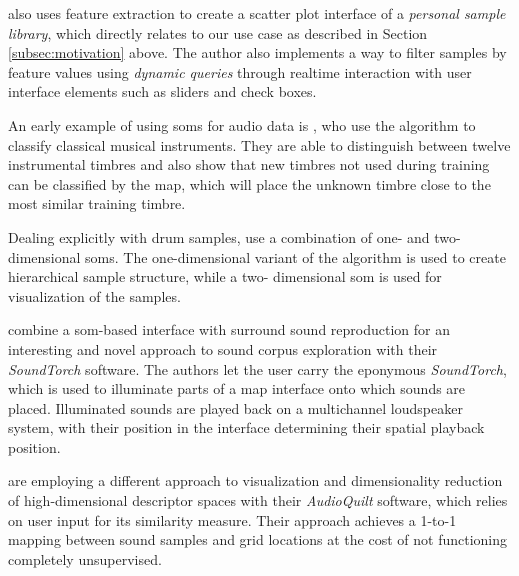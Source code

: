 \citet{coleman2007} also uses feature extraction to create a scatter plot
interface of a \textit{personal sample library}, which directly relates to our
use case as described in Section \ref{subsec:motivation} above. The author
also implements a way to filter samples by feature values using
\textit{dynamic queries} through realtime interaction with user interface
elements such as sliders and check boxes.

An early example of using \glspl{som} for audio data is \citet{cosi1994}, who
use the algorithm to classify classical musical instruments. They are able to
distinguish between twelve instrumental timbres and also show that new timbres
not used during training can be classified by the map, which will place the
unknown timbre close to the most similar training timbre.

\smallskip

Dealing explicitly
with drum samples, \citet{pampalk2004} use a combination of one- and two-
dimensional \glspl{som}. The one-dimensional variant of the algorithm is used
to create hierarchical sample structure, while a two- dimensional \gls{som} is
used for visualization of the samples.

\smallskip

\citet{heise2008} combine a \gls{som}-based interface with surround sound
reproduction for an interesting and novel approach to sound corpus exploration
with their \textit{SoundTorch} software. The authors let the user carry the
eponymous \textit{SoundTorch}, which is used to illuminate parts of a map
interface onto which sounds are placed. Illuminated sounds are played back on a
multichannel loudspeaker system, with their position in the interface
determining their spatial playback position.

\smallskip

\citet{fried2014} are employing a different approach to visualization and
dimensionality reduction of high-dimensional descriptor spaces with their
\textit{AudioQuilt} software, which relies on user input for its similarity
measure. Their approach achieves a 1-to-1 mapping between sound samples and
grid locations at the cost of not functioning completely unsupervised.

\smallskip

